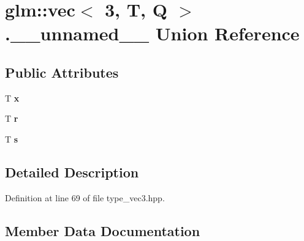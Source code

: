 \hypertarget{unionglm_1_1vec_3_013_00_01T_00_01Q_01_4_8____unnamed____}{}\section{glm\+:\+:vec$<$ 3, T, Q $>$.\+\_\+\+\_\+unnamed\+\_\+\+\_\+ Union Reference}
\label{unionglm_1_1vec_3_013_00_01T_00_01Q_01_4_8____unnamed____}
\subsection*{Public Attributes}
\begin{DoxyCompactItemize}
\item 
\mbox{\label{unionglm_1_1vec_3_013_00_01T_00_01Q_01_4_8____unnamed_____a9dd4e461268c8034f5c8564e155c67a6}} 
T {\bfseries x}
\item 
\mbox{\label{unionglm_1_1vec_3_013_00_01T_00_01Q_01_4_8____unnamed_____a4b43b0aee35624cd95b910189b3dc231}} 
T {\bfseries r}
\item 
\mbox{\label{unionglm_1_1vec_3_013_00_01T_00_01Q_01_4_8____unnamed_____a03c7c0ace395d80182db07ae2c30f034}} 
T {\bfseries s}
\end{DoxyCompactItemize}


\subsection{Detailed Description}


Definition at line 69 of file type\+\_\+vec3.\+hpp.



\subsection{Member Data Documentation}
\mbox{\label{unionglm_1_1vec_3_013_00_01T_00_01Q_01_4_8____unnamed_____a4b43b0aee35624cd95b910189b3dc231}} 
